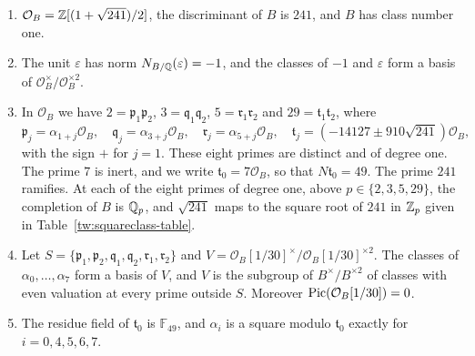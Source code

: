 \begin{lemma}\label{tw:base}
\begin{enumerate}
\item[(a)] $\mathcal O_B=\mathbb Z[(1+\sqrt{241})/2]$, the discriminant of $B$ is
 $241$, and $B$ has class number one.
\item[(b)] The unit $\varepsilon$ has norm $N_{B/\mathbb Q}(\varepsilon)=-1$, and the
 classes of $-1$ and $\varepsilon$ form a basis of
 $\mathcal O_B^\times/\mathcal O_B^{\times2}$.
\item[(c)] In $\mathcal O_B$ we have $2=\mathfrak p_1\mathfrak p_2$,
 $3=\mathfrak q_1\mathfrak q_2$, $5=\mathfrak r_1\mathfrak r_2$ and
 $29=\mathfrak t_1\mathfrak t_2$, where
 \[
  \mathfrak p_j=\alpha_{1+j}\mathcal O_B,\quad
  \mathfrak q_j=\alpha_{3+j}\mathcal O_B,\quad
  \mathfrak r_j=\alpha_{5+j}\mathcal O_B,\quad
  \mathfrak t_j=(-14127\pm910\sqrt{241})\mathcal O_B,
 \]
 with the sign $+$ for $j=1$. These eight primes are distinct and of degree
 one. The prime $7$ is inert, and we write $\mathfrak t_0=7\mathcal O_B$, so
 that $N\mathfrak t_0=49$. The prime $241$ ramifies. At each of the eight
 primes of degree one, above $p\in\{2,3,5,29\}$, the completion of $B$ is
 $\mathbb Q_p$, and $\sqrt{241}$ maps to the square root of $241$ in $\mathbb Z_p$ given in
 Table~\ref{tw:squareclass-table}.
\item[(d)] Let $S=\{\mathfrak p_1,\mathfrak p_2,\mathfrak q_1,\mathfrak q_2,\mathfrak r_1,\mathfrak r_2\}$
 and $V=\mathcal O_B[1/30]^\times/\mathcal O_B[1/30]^{\times2}$. The classes
 of $\alpha_0,\dots,\alpha_7$ form a basis of $V$, and $V$ is the subgroup of
 $B^\times/B^{\times2}$ of classes with even valuation at every prime outside
 $S$. Moreover $\operatorname{Pic}(\mathcal O_B[1/30])=0$.
\item[(e)] The residue field of $\mathfrak t_0$ is $\mathbb F_{49}$, and
 $\alpha_i$ is a square modulo $\mathfrak t_0$ exactly for $i=0,4,5,6,7$.
\end{enumerate}
\end{lemma}

